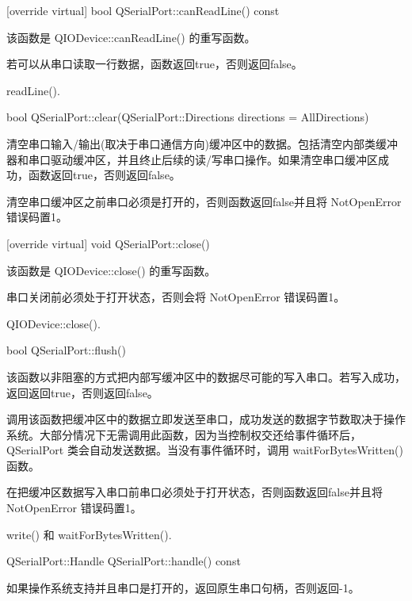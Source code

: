[override virtual] bool QSerialPort::canReadLine() const

该函数是 QIODevice::canReadLine() 的重写函数。

若可以从串口读取一行数据，函数返回true，否则返回false。

\begin{seeAlso}
readLine().
\end{seeAlso}

bool QSerialPort::clear(QSerialPort::Directions directions = AllDirections)

清空串口输入/输出(取决于串口通信方向)缓冲区中的数据。包括清空内部类缓冲器和串口驱动缓冲区，并且终止后续的读/写串口操作。如果清空串口缓冲区成功，函数返回true，否则返回false。

\begin{notice}
清空串口缓冲区之前串口必须是打开的，否则函数返回false并且将 NotOpenError 错误码置1。
\end{notice}

[override virtual] void QSerialPort::close()

该函数是 QIODevice::close() 的重写函数。

\begin{notice}
串口关闭前必须处于打开状态，否则会将 NotOpenError 错误码置1。
\end{notice}

\begin{seeAlso}
QIODevice::close().
\end{seeAlso}

bool QSerialPort::flush()

该函数以非阻塞的方式把内部写缓冲区中的数据尽可能的写入串口。若写入成功，返回返回true，否则返回false。

调用该函数把缓冲区中的数据立即发送至串口，成功发送的数据字节数取决于操作系统。大部分情况下无需调用此函数，因为当控制权交还给事件循环后，QSerialPort 类会自动发送数据。当没有事件循环时，调用 waitForBytesWritten() 函数。

\begin{notice}
在把缓冲区数据写入串口前串口必须处于打开状态，否则函数返回false并且将 NotOpenError 错误码置1。
\end{notice}

\begin{seeAlso}
write() 和 waitForBytesWritten().
\end{seeAlso}

QSerialPort::Handle QSerialPort::handle() const

如果操作系统支持并且串口是打开的，返回原生串口句柄，否则返回-1。


